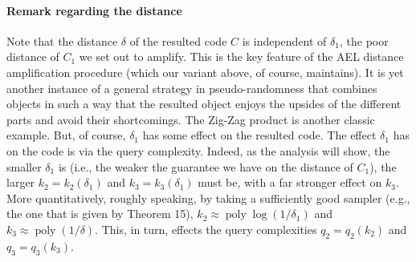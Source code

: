 \documentclass[10pt,a4paper]{article}
\begin{document}
\paragraph{Remark regarding the distance}
Note that the distance $\delta$ of the resulted code $C$ is independent of $\delta_1$, the poor distance of $C_1$ we set out to amplify. This is the key feature of the AEL distance amplification procedure (which our variant above, of course, maintains). It is yet another instance of a general strategy in pseudo-randomness that combines objects in such a way that the resulted object enjoys the upsides of the different parts and avoid their shortcomings. The Zig-Zag product is another classic example. But, of course, $\delta_1$ has some effect on the resulted code. The effect $\delta_1$ has on the code is via the query complexity. Indeed, as the analysis will show, the smaller $\delta_1$ is (i.e., the weaker the guarantee we have on the distance of $C_1$), the larger $k_2=k_2(\delta_1)$ and $k_3=k_3(\delta_1)$ must be, with a far stronger effect on $k_3$. More quantitatively, roughly speaking, by taking a sufficiently good sampler (e.g., the one that is given by Theorem 15), $k_2\approx\operatorname{poly}\log(1/\delta_1)$ and $k_3\approx\operatorname{poly}(1/\delta)$. This, in turn, effects the query complexities $q_2=q_2(k_2)$ and $q_3=q_3(k_3)$.
\end{document}
